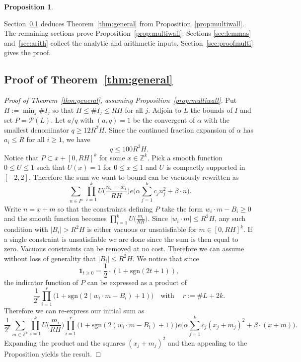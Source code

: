 \documentclass[a4paper,reqno,12pt]{amsart}
\theoremstyle{plain}
\newtheorem{proposition}[theorem]{Proposition}
\theoremstyle{plain}
\theoremstyle{remark}
\theoremstyle{plain}
\newcommand{\cP}{\mathscr{P}}
\theoremstyle{plain}
\theoremstyle{plain}
\begin{document}
{\begin{proposition}
\end{proposition}

Section~\ref{sec:general} deduces Theorem~\ref{thm:general} from
Proposition~\ref{prop:multiwall}. The remaining sections prove
Proposition~\ref{prop:multiwall}: Sections
\ref{sec:lemmas} and~\ref{sec:arith} collect the analytic and
arithmetic inputs{.} Section~\ref{sec:proofmulti} gives the proof.

\subsection{Proof of Theorem~\ref{thm:general}}\label{sec:general}
\begin{proof}[Proof of Theorem~\ref{thm:general}, assuming Proposition~\ref{prop:multiwall}]
Put $H:=\min_j\#I_j$ so that $H \leq \# I_j \leq R H$ for all $j$.  Adjoin to $L$ the bounds of $I$ and set $P=\cP(L)$.
Let $a / q$ with $(a,q) = 1$ be the convergent of $\alpha$ with
the smallest denominator $q \geq 12 R^2 H$. Since the continued fraction expansion
of $\alpha$ has $a_i \leq R$ for all $i \geq 1${, we have} 
$$
q \leq 100 R^3 H.
$$
Notice that $P \subset x + [0, R H]^k$ for some $x \in \mathbb{Z}^k$. 
Pick a smooth function $0 \leq U \leq 1$ such that $U(x) = 1$ for $0 \leq x \leq 1$
and $U$ is compactly supported in $[-2,2]$. 
Therefore the sum we want to bound can be vacuously rewritten as
$$
\sum_{\substack{n \in P}} \prod_{i = 1}^{k} U \Big ( \frac{n_i - x_i}{R H} \Big ) e \Big ( \alpha \sum_{j = 1}^{k} c_j n_j^2 + \beta \cdot n \Big ). 
$$
Write $n = x + m$ so that the constraints defining $P$ take the form $w_i \cdot m - B_i \geq 0$
and the smooth function becomes $\prod_{i = 1}^{k} U \Big ( \frac{m_i}{R H} \Big )$.
Since $|w_i \cdot m| \leq R^2 H$, any such condition with $|B_i| > R^2 H$ is
either vacuous or unsatisfiable for $m \in [0, R H]^k$. 
If a single constraint is unsatisfiable we are done
since the sum is then equal to zero. Vacuous constraints can be removed at no cost.
Therefore we can assume without loss of generality that $|B_i| \leq R^2 H$. 
We notice that since 
$$
\mathbf{1}_{t \geq 0} = \frac{1}{2} \cdot ( 1 + \text{sgn}(2 t + 1) ){,}
$$
the indicator function of $P$ can be expressed as a product of 
$$
\frac{1}{2^{r}} \prod_{i = 1}^{r} \Big ( 1 + \text{sgn} (2 (w_i \cdot m - B_i) + 1) \Big ) \quad \text{with} \quad \ r := \# L + 2k.
$$
Therefore we can re-express our initial sum as
$$
\frac{1}{2^{r}} \sum_{m \in \mathbb{Z}^k} \prod_{i = 1}^{k} U \Big ( \frac{m_i}{R H} \Big ) \prod_{i = 1}^{r} \Big (1 + \text{sgn} ( 2 (w_i \cdot m - B_i) + 1) \Big ) e \Big ( \alpha \sum_{j = 1}^{k} c_j (x_j + m_j)^2 + \beta \cdot (x + m) \Big ).
$$
Expanding the product and the squares $(x_j + m_j)^2$ and then appealing to the Proposition yields the result. 
\end{proof}

}
\end{document}
